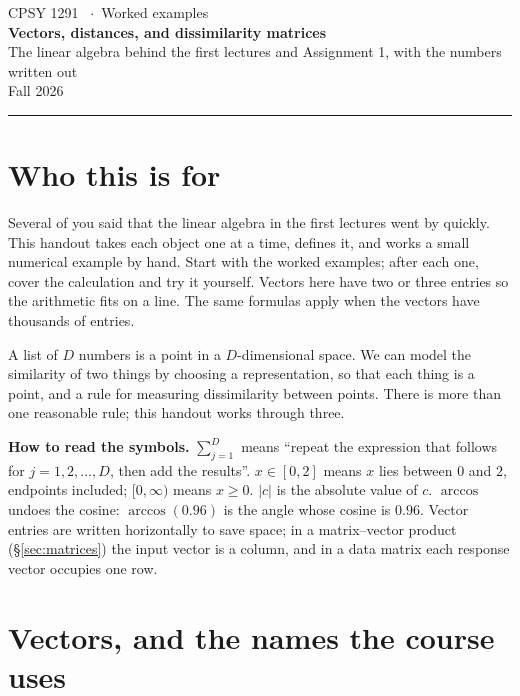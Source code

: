 \documentclass[11pt]{article}
\begin{document}
\begin{center}
{\sffamily\small\color{accent}CPSY 1291 \ $\cdot$\ Worked examples}\\[5pt]
{\sffamily\LARGE\bfseries\color{brown} Vectors, distances, and dissimilarity matrices}\\[3pt]
{\sffamily\large\color{ink} The linear algebra behind the first lectures and Assignment 1, with the numbers written out}\\[6pt]
{\color{lightgray}\small Fall 2026}
\end{center}
\vspace{4pt}\hrule\vspace{10pt}

\section*{Who this is for}

Several of you said that the linear algebra in the first lectures went by quickly.
This handout takes each object one at a time, defines it, and works a small numerical
example by hand. Start with the worked examples; after each one, cover the calculation and
try it yourself. Vectors here have two or three entries so the arithmetic fits on a line.
The same formulas apply when the vectors have thousands of entries.

\begin{keybox}
 A list of $D$ numbers is a point in a $D$-dimensional space.
We can model the similarity of two things by choosing a representation, so that each thing
is a point, and a rule for measuring dissimilarity between points. There is more than one
reasonable rule; this handout works through three.
\end{keybox}

\textbf{How to read the symbols.} $\sum_{j=1}^{D}$ means ``repeat the expression that follows
for $j = 1, 2, \dots, D$, then add the results''. $x \in [0, 2]$ means $x$ lies between $0$
and $2$, endpoints included; $[0, \infty)$ means $x \geq 0$. $|c|$ is the absolute value
of $c$. $\arccos$ undoes the cosine: $\arccos(0.96)$ is the angle whose cosine is $0.96$.
Vector entries are written horizontally to save space; in a matrix--vector product
(\S\ref{sec:matrices}) the input vector is a column, and in a data matrix each response
vector occupies one row.

\section{Vectors, and the names the course uses}
\end{document}
